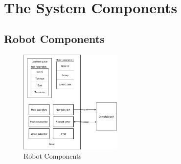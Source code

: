 \section{The System Components}

\subsection{Robot Components}


\begin{figure}[htb]
	\centering
	\includegraphics[width = 0.45\textwidth]{content/images/ch3/system_component_robot.drawio.png}
	\caption{Robot Components}
	\label{fig:robot_components}
\end{figure}

